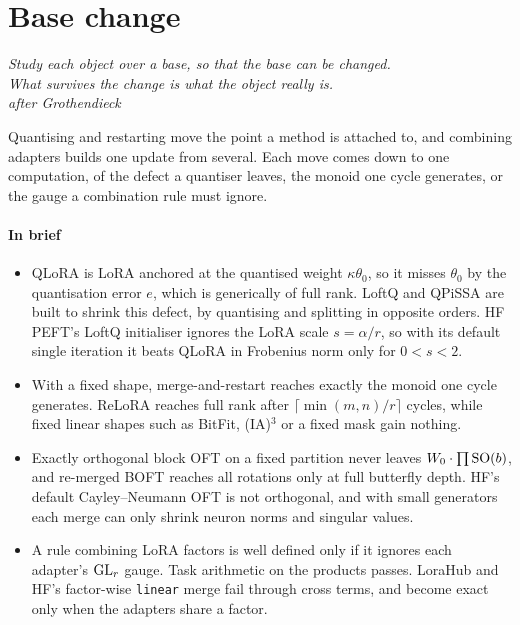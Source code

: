 \section{Base change}\label{sec:base}

\begin{flushright}
\small\itshape Study each object over a base, so that the base can be changed.\\
What survives the change is what the object really is.\\[2pt]
{\upshape\footnotesize after Grothendieck}
\end{flushright}

Quantising and restarting move the point a method is attached to, and combining adapters builds one update from
several. Each move comes down to one computation, of the defect a quantiser leaves, the monoid one cycle generates, or the
gauge a combination rule must ignore.

\paragraph{In brief}
\begin{itemize}
  \item QLoRA is LoRA anchored at the quantised weight $\kappa\theta_0$, so it misses $\theta_0$ by the quantisation
    error $e$, which is generically of full rank. LoftQ and QPiSSA are built to shrink this defect, by quantising and
    splitting in opposite orders. HF PEFT's LoftQ initialiser ignores the LoRA scale $s=\alpha/r$, so with its default single
    iteration it beats QLoRA in Frobenius norm only for $0<s<2$.
  \item With a fixed shape, merge-and-restart reaches exactly the monoid one cycle generates. ReLoRA reaches full rank
    after $\lceil\min(m,n)/r\rceil$ cycles, while fixed linear shapes such as BitFit, (IA)$^3$ or a fixed mask gain
    nothing.
  \item Exactly orthogonal block OFT on a fixed partition never leaves $W_0\cdot\prod\mathrm{SO}(b)$, and re-merged BOFT
    reaches all rotations only at full butterfly depth. HF's default Cayley--Neumann OFT is not orthogonal, and with
    small generators each merge can only shrink neuron norms and singular values.
  \item A rule combining LoRA factors is well defined only if it ignores each adapter's $\mathrm{GL}_r$ gauge. Task arithmetic
    on the products passes. LoraHub and HF's factor-wise \texttt{linear} merge fail through cross terms, and become
    exact only when the adapters share a factor.
\end{itemize}

